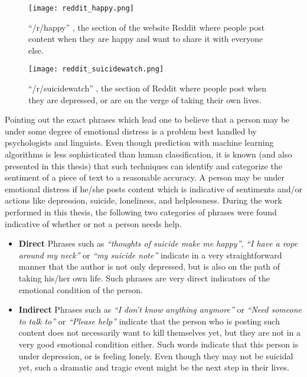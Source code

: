 \begin{figure}[t!]
    \centering
    \texttt{[image: reddit\_happy.png]}
    \caption{``/r/happy'' \cite{reddit_happy}, the section of the website Reddit \cite{reddit} where people post content when they are happy and want to share it with everyone else.}
    \label{fig:reddit_happy}
\end{figure}

\begin{figure}[t!]
    \centering
    \texttt{[image: reddit\_suicidewatch.png]}
    \caption{``/r/suicidewatch'' \cite{reddit_suicidewatch}, the section of Reddit \cite{reddit} where people post when they are depressed, or are on the verge of taking their own lives.}
    \label{fig:reddit_suicidewatch}
\end{figure}

Pointing out the exact phrases which lead one to believe that a person may be under some degree of emotional distress is a problem best handled by psychologists and linguists. Even though prediction with machine learning algorithms is less sophisticated than human classification, it is known (and also presented in this thesis) that such techniques can identify and categorize the sentiment of a piece of text to a reasonable accuracy. A person may be under emotional distress if he/she posts content which is indicative of sentiments and/or actions like depression, suicide, loneliness, and helplessness. During the work performed in this thesis, the following two categories of phrases were found indicative of whether or not a person needs help.

\begin{itemize}
    \item{\textbf{Direct} Phrases such as \emph{``thoughts of suicide make me happy''}, \emph{``I have a rope around my neck''} or \emph{``my suicide note''} indicate in a very straightforward manner that the author is not only depressed, but is also on the path of taking his/her own life. Such phrases are very direct indicators of the emotional condition of the person.}
    \item{\textbf{Indirect} Phrases such as \emph{``I don't know anything anymore''} or \emph{``Need someone to talk to''} or \emph{``Please help''} indicate that the person who is posting such content does not necessarily want to kill themselves yet, but they are not in a very good emotional condition either. Such words indicate that this person is under depression, or is feeling lonely. Even though they may not be suicidal yet, such a dramatic and tragic event might be the next step in their lives.}
\end{itemize}

